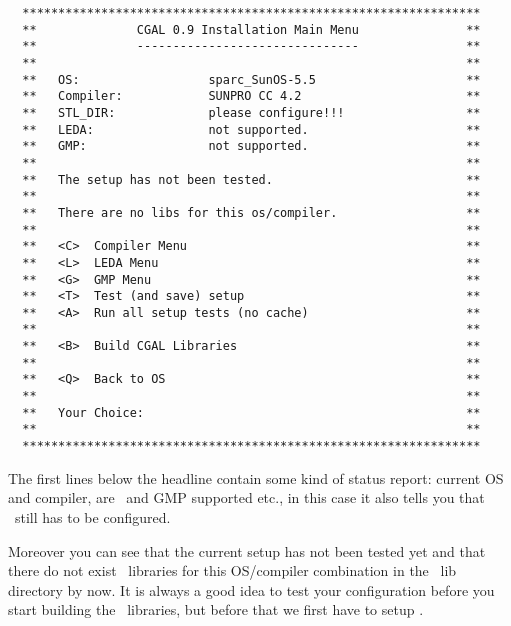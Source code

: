 \begin{scriptsize}\label{pic:main-menu}
\begin{verbatim}
  ****************************************************************
  **              CGAL 0.9 Installation Main Menu               **
  **              -------------------------------               **
  **                                                            **
  **   OS:                  sparc_SunOS-5.5                     **
  **   Compiler:            SUNPRO CC 4.2                       **
  **   STL_DIR:             please configure!!!                 **
  **   LEDA:                not supported.                      **
  **   GMP:                 not supported.                      **
  **                                                            **
  **   The setup has not been tested.                           **
  **                                                            **
  **   There are no libs for this os/compiler.                  **
  **                                                            **
  **   <C>  Compiler Menu                                       **
  **   <L>  LEDA Menu                                           **
  **   <G>  GMP Menu                                            **
  **   <T>  Test (and save) setup                               **
  **   <A>  Run all setup tests (no cache)                      **
  **                                                            **
  **   <B>  Build CGAL Libraries                                **
  **                                                            **
  **   <Q>  Back to OS                                          **
  **                                                            **
  **   Your Choice:                                             **
  **                                                            **
  ****************************************************************
\end{verbatim}
\end{scriptsize}

The first lines below the headline contain some kind of status report:
current OS and compiler, are \leda\ and GMP supported etc., in this
case it also tells you that \stl\ still has to be configured.

Moreover you can see that the current setup has not been tested yet
and that there do not exist \cgal\ libraries for this OS/compiler
combination in the \cgal\ lib directory by now. It is always a good
idea to test your configuration before you start building the \cgal\ 
libraries, but before that we first have to setup \stl.

